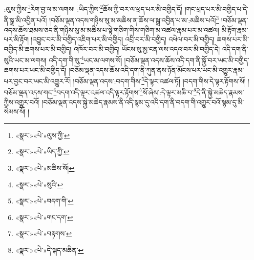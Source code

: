 :ལུས་ཀྱིས་\footnote{«སྣར་»«པེ་»ལུས་ཀྱི་}རེག་བྱ་ལ་མ་ལགས། :ཡིད་ཀྱིས་\footnote{«སྣར་»«པེ་»ཡིད་ཀྱི་}ཆོས་ཀྱི་བར་ལ་ཕྲད་པར་མི་བགྱིད་དོ། །གང་ཕྲད་པར་མི་བགྱིད་པ་དེ་ནི་སྒྲ་མི་འབྱིན་པའོ། །བཅོམ་ལྡན་འདས་གཉིས་སུ་མ་མཆིས་ན་ཆོས་ལ་སྒྲ་འབྱིན་པ་མ་:མཆིས་པའོ།\footnote{«སྣར་»«པེ་»མཆིས་སོ།} །བཅོམ་ལྡན་འདས་ཆོས་ཐམས་ཅད་ནི་གཉིས་སུ་མ་མཆིས་པ་སྟེ་གཅིག་གིས་གཅིག་མ་འཚལ་རྣམ་པར་མ་འཚལ། མི་རྟོག་རྣམ་པར་མི་རྟོག །འབྱུང་བར་མི་བགྱིད་འཇིག་པར་མི་བགྱིད། འབྲི་བར་མི་བགྱིད། འཕེལ་བར་མི་བགྱིད། ཆགས་པར་མི་བགྱིད་མི་ཆགས་པར་མི་བགྱིད། འཁོར་བར་མི་བགྱིད། ཡོངས་སུ་མྱ་ངན་ལས་འདའ་བར་མི་བགྱིད་དེ། འདི་དག་ནི་སུའི་ཡང་མ་ལགས། འདི་དག་གི་སུ་\footnote{«སྣར་»«པེ་»སུའི་}ཡང་མ་ལགས་སོ། །བཅོམ་ལྡན་འདས་ཆོས་འདི་དག་ནི་སྐྱོ་བར་ཡང་མི་བགྱིད་ཆགས་པར་ཡང་མི་བགྱིད་དོ། །བཅོམ་ལྡན་འདས་ཆོས་འདི་དག་ནི་ཀུན་ནས་ཉོན་མོངས་པར་ཡང་མི་འགྱུར་རྣམ་པར་བྱང་བར་ཡང་མི་འགྱུར་རོ། །བཅོམ་ལྡན་འདས་:བདག་གིས་\footnote{«སྣར་»«པེ་»བདག་གི་}དེ་ལྟར་འཚལ་ཏོ། །བདག་གིས་དེ་ལྟར་རྟོགས་སོ། །བཅོམ་ལྡན་འདས་གང་\footnote{«སྣར་»«པེ་»གང་དག་}བདག་འདི་ལྟར་འཚལ་འདི་ལྟར་རྟོགས་\footnote{«སྣར་»«པེ་»བརྟགས་}སོ་ཞེས་:དེ་ལྟར་མཆི་བ་\footnote{«སྣར་»«པེ་»དེ་སྐད་མཆིན་}དེ་ནི་སྐྱེ་མཆེད་རྣམས་ཀྱིས་འགྱུར་བའོ། །བཅོམ་ལྡན་འདས་སྐྱེ་མཆེད་རྣམས་ནི་འདི་སྙམ་དུ་འདི་དག་ནི་བདག་གི་འགྱུར་བའོ་སྙམ་དུ་མི་སེམས་སོ། །
